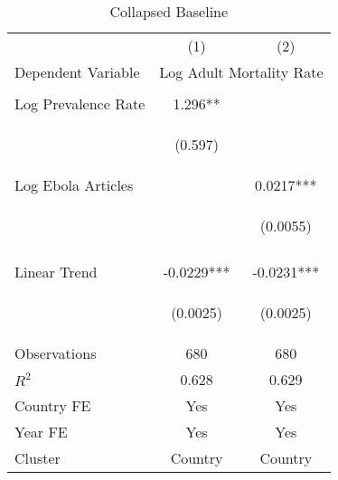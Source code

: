 \documentclass{article}
\begin{document}
\begin{table}[htbp] \centering \caption{Collapsed Baseline \label{Collapsed Baseline}}
\begin{tabular}{lcc} \hline
 & (1) & (2) \\
Dependent Variable & \multicolumn{2}{c}{Log Adult Mortality Rate} \\ \hline
\vspace{4pt} & \begin{footnotesize}\end{footnotesize} & \begin{footnotesize}\end{footnotesize} \\
Log Prevalence Rate & 1.296** &  \\
\vspace{4pt} & \begin{footnotesize}(0.597)\end{footnotesize} & \begin{footnotesize}\end{footnotesize} \\
Log Ebola Articles &  & 0.0217*** \\
 & \begin{footnotesize}\end{footnotesize} & \begin{footnotesize}(0.0055)\end{footnotesize} \\
\vspace{4pt} & \begin{footnotesize}\end{footnotesize} & \begin{footnotesize}\end{footnotesize} \\
Linear Trend & -0.0229*** & -0.0231*** \\
\vspace{4pt} & \begin{footnotesize}(0.0025)\end{footnotesize} & \begin{footnotesize}(0.0025)\end{footnotesize} \\
Observations & 680 & 680 \\
$R^2$ & 0.628 & 0.629 \\
Country FE & Yes & Yes \\
Year FE & Yes & Yes \\
Cluster & Country & Country \\

\end{tabular}
\end{table}
\end{document}
